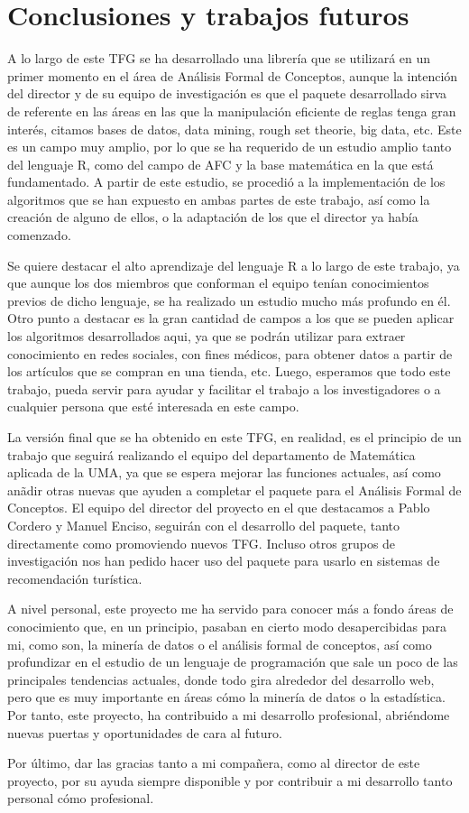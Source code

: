 \section{Conclusiones y trabajos futuros}
A lo largo de este TFG se ha desarrollado una librer\'ia que se utilizar\'a en un primer momento en el \'area de An\'alisis Formal de Conceptos, aunque la intenci\'on del director y de su equipo de investigaci\'on es que el paquete desarrollado sirva de referente en las \'areas en las que la manipulaci\'on eficiente de reglas tenga gran inter\'es, citamos bases de datos, data mining, rough set theorie, big data, etc. Este es un campo muy amplio, por lo que se ha requerido de un estudio amplio tanto del lenguaje R, como del campo de AFC y la base matem\'atica en la que est\'a fundamentado. A partir de este estudio, se procedi\'o a la implementaci\'on de los algoritmos que se han expuesto en ambas partes de este trabajo, as\'i como la creaci\'on de alguno de ellos, o la adaptaci\'on de los que el director ya hab\'ia comenzado.

Se quiere destacar el alto aprendizaje del lenguaje R a lo largo de este trabajo, ya que aunque los dos miembros que conforman el equipo ten\'ian conocimientos previos de dicho lenguaje, se ha realizado un estudio mucho m\'as profundo en \'el.
Otro punto a destacar es la gran cantidad de campos a los que se pueden aplicar los algoritmos desarrollados aqui, ya que se podr\'an utilizar para extraer conocimiento en redes sociales, con fines m\'edicos, para obtener datos a partir de los art\'iculos que se compran en una tienda, etc. Luego, esperamos que todo este trabajo, pueda servir para ayudar y facilitar el trabajo a los investigadores o a cualquier persona que est\'e interesada en este campo.

La versi\'on final que se ha obtenido en este TFG, en realidad, es el principio de un trabajo que seguir\'a realizando el equipo del departamento de Matem\'atica aplicada de la UMA, ya que se espera mejorar las funciones actuales, as\'i como an\~adir otras nuevas que ayuden a completar el paquete para el An\'alisis Formal de Conceptos. El equipo del director del proyecto en el que destacamos a Pablo Cordero y Manuel Enciso, seguir\'an con el desarrollo del paquete, tanto directamente como promoviendo nuevos TFG. Incluso otros grupos de investigaci\'on nos han pedido hacer uso del paquete para usarlo en sistemas de recomendaci\'on tur\'istica. 

A nivel personal, este proyecto me ha servido para conocer m\'as a fondo \'areas de conocimiento que, en un principio, pasaban en cierto modo desapercibidas para mi, como son, la miner\'ia de datos o el an\'alisis formal de conceptos, as\'i como profundizar en el estudio de un lenguaje de programaci\'on que sale un poco de las principales tendencias actuales, donde todo gira alrededor del desarrollo web, pero que es muy importante en \'areas c\'omo la miner\'ia de datos o la estad\'istica. Por tanto, este proyecto, ha contribuido a mi desarrollo profesional, abri\'endome nuevas puertas y oportunidades de cara al futuro.

Por \'ultimo, dar las gracias tanto a mi compa\~nera, como al director de este proyecto, por su ayuda siempre disponible y por contribuir a mi desarrollo tanto personal c\'omo profesional.

\newpage